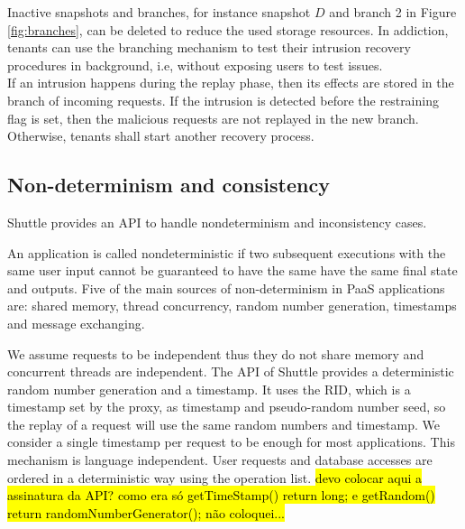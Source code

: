 Inactive snapshots and branches, for instance snapshot $D$ and branch 2 in Figure \ref{fig:branches}, can be deleted to reduce the used storage resources. In addiction, tenants can use the branching mechanism to test their intrusion recovery procedures in background, i.e, without exposing users to test issues.\\

If an intrusion happens during the replay phase, then its effects are stored in the branch of incoming requests. If the intrusion is detected before the restraining flag is set, then the malicious requests are not replayed in the new branch. Otherwise, tenants shall start another recovery process.\\





\subsection{Non-determinism and consistency}
\label{sec:arch:consistency}

Shuttle provides an \ac{API} to handle nondeterminism and inconsistency cases.

An application is called nondeterministic if two subsequent executions with the same user input cannot be guaranteed to have the same have the same final state and outputs. Five of the main sources of non-determinism in \ac{PaaS} applications are: shared memory, thread concurrency, random number generation, timestamps and message exchanging.

We assume requests to be independent thus they do not share memory and concurrent threads are independent. The \ac{API} of Shuttle provides a deterministic random number generation and a timestamp. It uses the \acf{RID}, which is a timestamp set by the proxy, as timestamp and pseudo-random number seed, so the replay of a request will use the same random numbers and timestamp. We consider a single timestamp per request to be enough for most applications. This mechanism is language independent. User requests and database accesses are ordered in a deterministic way using the operation list. \hl{devo colocar aqui a assinatura da API? como era só getTimeStamp() return long; e getRandom() return randomNumberGenerator(); não coloquei...} \\

